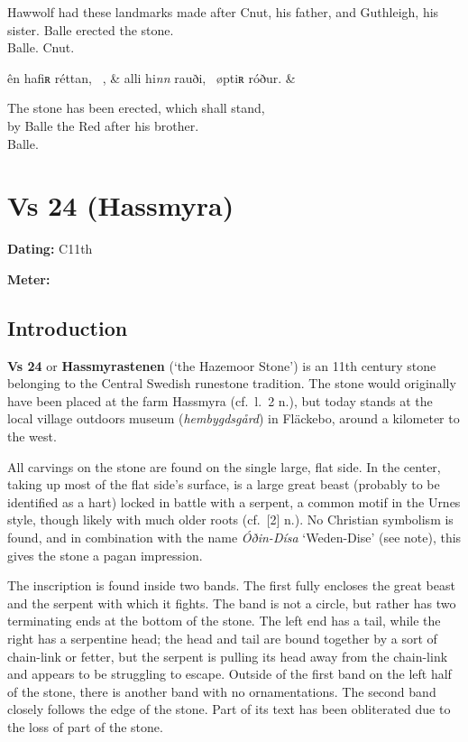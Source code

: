 \bpb Hawwolf had these landmarks made after Cnut, his father, and Guthleigh, his sister.  Balle erected the stone. \\
Balle.  Cnut.\epb\epg


\bvg\bva[][3]%
ên hafiʀ réttan, \hld\ , &
alli hi\emph{nn} rauði, \hld\ øptiʀ róður. &
\eva

\bvb The stone has been erected, which shall stand, \\
by Balle the Red after his brother. \\
Balle.\evb\evg

\sectionline\clearpage


\section{Vs 24 (Hassmyra)}

\begin{flushright}%
\textbf{Dating:} C11th

\textbf{Meter:} \Fornyrdislag
\end{flushright}%

\subsection{Introduction}

\textbf{Vs 24} or \textbf{Hassmyrastenen} (‘the Hazemoor Stone’) is an 11th century stone belonging to the Central Swedish runestone tradition.  The stone would originally have been placed at the farm Hassmyra (cf.~l.~2 n.), but today stands at the local village outdoors museum (\emph{hembygdsgård}) in Fläckebo, around a kilometer to the west.


All carvings on the stone are found on the single large, flat side.  In the center, taking up most of the flat side’s surface, is a large great beast (probably to be identified as a hart) locked in battle with a serpent, a common motif in the Urnes style, though likely with much older roots (cf.~[2] n.).  No Christian symbolism is found, and in combination with the name \emph{Óðin-Dísa} ‘Weden-Dise’ (see note), this gives the stone a pagan impression.

The inscription is found inside two bands.  The first fully encloses the great beast and the serpent with which it fights.  The band is not a circle, but rather has two terminating ends at the bottom of the stone.  The left end has a tail, while the right has a serpentine head; the head and tail are bound together by a sort of chain-link or fetter, but the serpent is pulling its head away from the chain-link and appears to be struggling to escape.  Outside of the first band on the left half of the stone, there is another band with no ornamentations.  The second band closely follows the edge of the stone.  Part of its text has been obliterated due to the loss of part of the stone.

